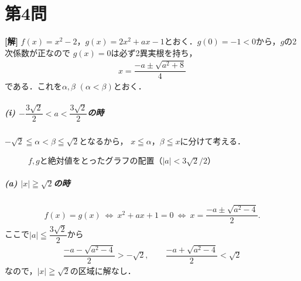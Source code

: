 \documentclass[../main.tex]{subfiles}
\begin{document}
\section*{第4問}

{\bf [解]}
$f(x)=x^2-2$，$g(x)=2x^2+ax-1$とおく．$g(0)=-1<0$から，$g$の2次係数が正なので
$g(x)=0$は必ず2異実根を持ち，
\begin{align}x=\dfrac{-a\pm\sqrt{a^2+8}}{4}
\end{align}
である．これを$\alpha,\beta$ $(\alpha<\beta)$とおく．

\subparagraph{(i) $-\dfrac{3\sqrt{2}}{2}<a<\dfrac{3\sqrt{2}}{2}$の時}
$-\sqrt{2}\leqq\alpha<\beta\leqq\sqrt{2}$となるから，
$x\leqq\alpha$，$\beta\leqq x$に分けて考える．
\begin{figure}[H]
  \begin{center}
  \end{center}
  \caption{$f,g$と絶対値をとったグラフの配置（$|a|<3\sqrt{2}/2$）}
\end{figure}
\subparagraph{(a) $|x|\geqq\sqrt{2}$の時}
\begin{align}
  f(x)=g(x)\ \Longleftrightarrow\ x^2+ax+1=0
  \ \Longleftrightarrow\ x=\dfrac{-a\pm\sqrt{a^2-4}}{2}.
\end{align}
ここで$|a|\leqq\dfrac{3\sqrt{2}}{2}$から
\begin{align}
  \dfrac{-a-\sqrt{a^2-4}}{2}>-\sqrt{2},\qquad
  \dfrac{-a+\sqrt{a^2-4}}{2}<\sqrt{2}
\end{align}
なので，$|x|\geqq\sqrt{2}$の区域に解なし．
\end{document}
